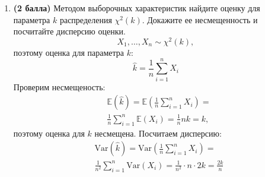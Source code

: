 \documentclass{assignment}
\begin{document}
\begin{enumerate}
    \item \textbf{(2 балла)} Методом выборочных характеристик найдите оценку для параметра $k$ распределения $\chi^2(k)$. Докажите ее несмещенность и посчитайте дисперсию оценки.
    \start
    \begin{equation}
        X_1, \ldots, X_n \sim \chi^2(k),
    \end{equation}
    поэтому оценка для параметра $k$:
    \begin{equation}
        \hat{k} = \frac{1}{n}\sum_{i=1}^{n} X_i
    \end{equation}
    Проверим несмещеность:
    \begin{align*}
        &\mathbb{E}(\hat{k}) = \mathbb{E} (\frac{1}{n}\sum_{i=1}^{n} X_i) = \\
        &\frac{1}{n}\sum_{i=1}^{n} \mathbb{E}(X_i) = \frac{1}{n}n k = k,
    \end{align*}
    поэтому оценка для $k$ несмещена. Посчитаем дисперсию:
    \begin{align*}
        &\text{Var}(\hat{k}) = \text{Var}(\frac{1}{n}\sum_{i=1}^{n} X_i) = \\
        &\frac{1}{n^2}\sum_{i=1}^{n}\text{Var}(X_i) = \frac{1}{n^2}\cdot n\cdot 2k = \frac{2k}{n}
    \end{align*}
    \finish

    
\newpage

\end{enumerate}
\end{document}
